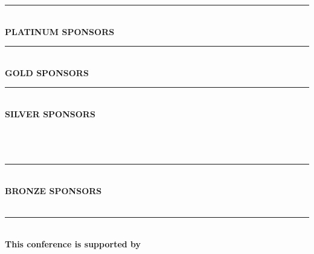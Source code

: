 \begin{center}
\rule{12cm}{1pt}\\[12pt]


\textsf{\textbf{\Large PLATINUM SPONSORS}}\\


\vspace{5mm}
\rule{12cm}{1pt}\\[12pt]
\textsf{\textbf{\Large GOLD SPONSORS}}\\[5mm]

\vspace{5mm}
\rule{12cm}{1pt}\\[12pt]
\textsf{\textbf{\LARGE SILVER SPONSORS}}\\[5mm]

\hspace{\separationwidth}
\\
\vspace{\separationwidth}
\hspace{\separationwidth}
\\
\vspace{\separationwidth}
\hspace{\separationwidth}
\hspace{\separationwidth}
\\
\vspace{\separationwidth}

\vspace{5mm}
\rule{12cm}{1pt}\\[12pt]
\textsf{\textbf{\Large BRONZE SPONSORS}}\\[5mm]
\hspace{\separationwidth}
\hspace{\separationwidth}
\\
\vspace{\separationwidth}
\hspace{\separationwidth}

\vspace{4mm}
\rule{12cm}{1pt}\\[12pt]
\textsf{\textbf{ This conference is supported by}}\\
\vspace{2mm}


\end{center}
